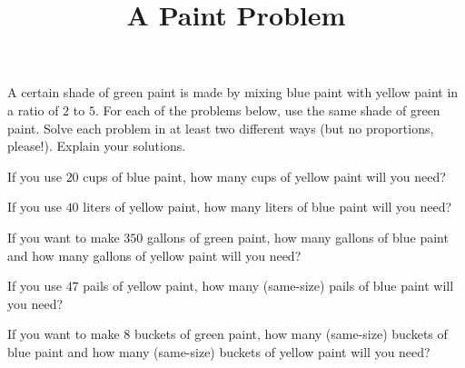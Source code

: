 \documentclass{ximera}
\title{A Paint Problem}
\begin{document}
\begin{abstract}
\end{abstract}
\maketitle


A certain shade of green paint is made by mixing blue paint with yellow paint in a ratio of $2$ to $5$.  For each of the problems below, use the same shade of green paint.  Solve each problem in at least two different ways (but no proportions, please!).  Explain your solutions.

\begin{problem}
If you use $20$ cups of blue paint, how many cups of yellow paint will you need?
\end{problem}

\begin{problem}
If you use $40$ liters of yellow paint, how many liters of blue paint will you need?
\end{problem}

\begin{problem}
If you want to make $350$ gallons of green paint, how many gallons of blue paint and how many gallons of yellow paint will you need?
\end{problem}

\begin{problem}
If you use $47$ pails of yellow paint, how many (same-size) pails of blue paint will you need?
\end{problem}

\begin{problem}
If you want to make $8$ buckets of green paint, how many (same-size) buckets of blue paint and how many (same-size) buckets of yellow paint will you need?
\end{problem}

\newpage
\end{document}
